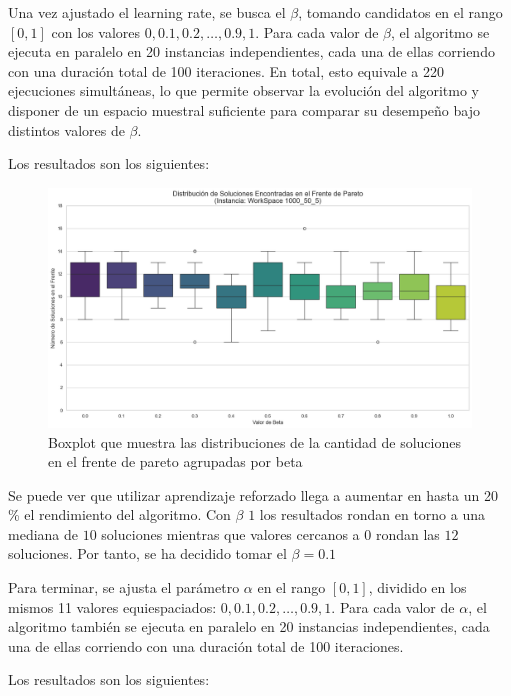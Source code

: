 \documentclass[12pt,a4paper]{book}
\begin{document}
Una vez ajustado el learning rate, se busca el $\beta$, tomando candidatos en el rango $[0,1]$ con los valores $0, 0.1, 0.2, \dots, 0.9, 1$.  
Para cada valor de $\beta$, el algoritmo se ejecuta en paralelo en 20 instancias independientes, cada una de ellas corriendo con una duración total de 100 iteraciones. 
En total, esto equivale a 220 ejecuciones simultáneas, lo que permite observar la evolución del algoritmo y disponer de un espacio muestral suficiente para comparar su desempeño bajo distintos valores de $\beta$.

Los resultados son los siguientes:

\begin{figure}[H]
    \centering
    \includegraphics[width=\linewidth]{images_finetuning/beta_20_100.png}
    \caption{Boxplot que muestra las distribuciones de la cantidad de soluciones en el frente de pareto agrupadas por beta }
    \label{fig:beta}
\end{figure}

Se puede ver que utilizar aprendizaje reforzado llega a aumentar en hasta un 20 \% el rendimiento del algoritmo. Con $\beta$ $1$ los resultados rondan en torno a una mediana de $10$ soluciones mientras que valores cercanos a $0$ rondan las $12$ soluciones. Por tanto, se ha decidido tomar el $\beta=0.1$

Para terminar, se ajusta el parámetro $\alpha$ en el rango $[0,1]$, dividido en los mismos 11 valores equiespaciados: $0, 0.1, 0.2, \dots, 0.9, 1$.  
Para cada valor de $\alpha$, el algoritmo también se ejecuta en paralelo en 20 instancias independientes, cada una de ellas corriendo con una duración total de 100 iteraciones.

Los resultados son los siguientes:
\end{document}
